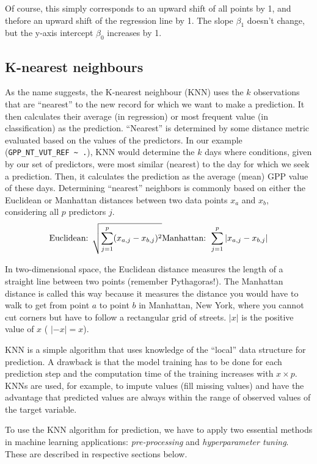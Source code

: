 \documentclass[
]{book}
\begin{document}
Of course, this simply corresponds to an upward shift of all points by 1, and thefore an upward shift of the regression line by 1. The slope \(\beta_1\) doesn't change, but the y-axis intercept \(\beta_0\) increases by 1.

\hypertarget{k-nearest-neighbours}{%
\subsection{K-nearest neighbours}\label{k-nearest-neighbours}}

As the name suggests, the K-nearest neighbour (KNN) uses the \(k\) observations that are ``nearest'' to the new record for which we want to make a prediction. It then calculates their average (in regression) or most frequent value (in classification) as the prediction. ``Nearest'' is determined by some distance metric evaluated based on the values of the predictors. In our example (\texttt{GPP\_NT\_VUT\_REF\ \textasciitilde{}\ .}), KNN would determine the \(k\) days where conditions, given by our set of predictors, were most similar (nearest) to the day for which we seek a prediction. Then, it calculates the prediction as the average (mean) GPP value of these days. Determining ``nearest'' neighbors is commonly based on either the Euclidean or Manhattan distances between two data points \(x_a\) and \(x_b\), considering all \(p\) predictors \(j\).
\[
\text{Euclidean: } \sqrt{ \sum_{j=1}^p (x_{a,j} - x_{b,j})^2  } \\
\text{Manhattan: } \sum_{j=1}^p | x_{a,j} - x_{b,j} |
\]

In two-dimensional space, the Euclidean distance measures the length of a straight line between two points (remember Pythagoras!). The Manhattan distance is called this way because it measures the distance you would have to walk to get from point \(a\) to point \(b\) in Manhattan, New York, where you cannot cut corners but have to follow a rectangular grid of streets. \(|x|\) is the positive value of \(x\) ( \(|-x| = x\)).

KNN is a simple algorithm that uses knowledge of the ``local'' data structure for prediction. A drawback is that the model training has to be done for each prediction step and the computation time of the training increases with \(x \times p\). KNNs are used, for example, to impute values (fill missing values) and have the advantage that predicted values are always within the range of observed values of the target variable.

To use the KNN algorithm for prediction, we have to apply two essential methods in machine learning applications: \emph{pre-processing} and \emph{hyperparameter tuning}. These are described in respective sections below.
\end{document}
